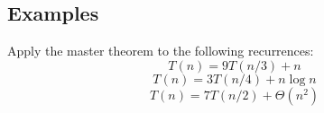 \documentclass[11  pt]{article}
\begin{document}
\subsection{Examples}
Apply the master theorem to the following recurrences:
\begin{equation}
	T(n) = 9 T(n/3) + n
\end{equation}
\begin{equation}
	T(n) = 3 T(n/4) + n \log n
\end{equation}
\begin{equation}
	T(n) = 7 T(n/2) + \Theta(n^2)
\end{equation}
%
%
%
%
%
%
%
%
%
%
\end{document}
